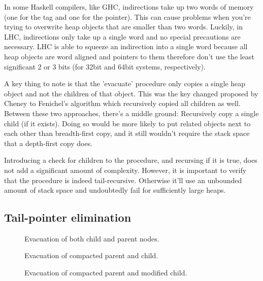 \documentclass[a4paper,oneside]{memoir}
\begin{document}
In some Haskell compilers, like GHC, indirections take up two words of memory
(one for the tag and one for the pointer). This can cause problems when you're
trying to overwrite heap objects that are smaller than two words. Luckily, in
LHC, indirections only take up a single word and no special precautions are
necessary. LHC is able to squeeze an indirection into a single word because
all heap objects are word aligned and pointers to them therefore don't use the
least significant 2 or 3 bits (for 32bit and 64bit systems, respectively).

A key thing to note is that the 'evacuate' procedure only copies a single heap
object and not the children of that object. This was the key changed proposed
by Cheney to Fenichel's algorithm which recursively copied all children as well.
\cite{Fenichel,Cheney:1970} Between these two approaches, there's a middle
ground: Recursively copy a single child (if it exists). Doing so would be more
likely to put related objects next to each other than breadth-first copy, and
it still wouldn't require the stack space that a depth-first copy does.

Introducing a check for children to the procedure, and recursing if it is true,
does not add a significant amount of complexity. However, it is important to
verify that the procedure is indeed tail-recursive. Otherwise it'll use an
unbounded amount of stack space and undoubtedly fail for sufficiently large
heaps.


\subsection{Tail-pointer elimination}

\begin{figure}[t]
  
  \caption{Evacuation of both child and parent nodes.}
  \label{parent_child}
\end{figure}

\begin{figure}[b]
  
  \caption{Evacuation of compacted parent and child.}
  \label{compacted_parent_child}
\end{figure}

\begin{figure}[t]
  
  \caption{Evacuation of compacted parent and modified child.}
  \label{modified_child}
\end{figure}
\end{document}
